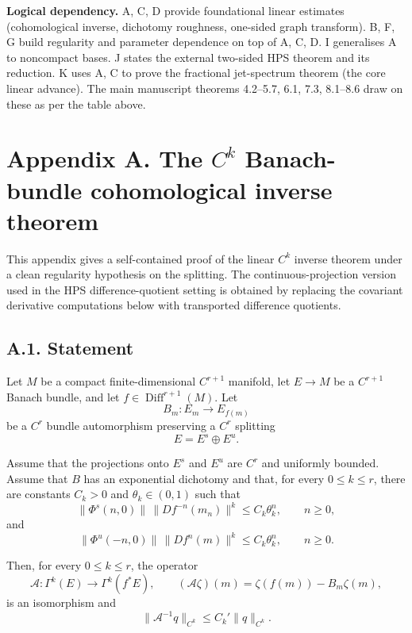 \documentclass[12pt,a4paper]{article}
\theoremstyle{plain}
\numberwithin{equation}{section}
\numberwithin{theorem}{section}
\begin{document}
\vspace{1em}

\noindent
\textbf{Logical dependency.} 
A, C, D provide foundational linear estimates (cohomological inverse, dichotomy roughness, one-sided graph transform).
B, F, G build regularity and parameter dependence on top of A, C, D.
I generalises A to noncompact bases.
J states the external two-sided HPS theorem and its reduction.
K uses A, C to prove the fractional jet-spectrum theorem (the core linear advance).
The main manuscript theorems 4.2--5.7, 6.1, 7.3, 8.1--8.6 draw on these as per the table above.


\section{Appendix A. The $C^k$ Banach-bundle cohomological inverse theorem}

This appendix gives a self-contained proof of the linear $C^k$ inverse theorem under a clean regularity hypothesis on the splitting. 
The continuous-projection version used in the HPS difference-quotient setting is obtained by replacing the covariant derivative computations below with transported difference quotients.

\subsection{A.1. Statement}

Let $M$ be a compact finite-dimensional $C^{r+1}$ manifold, let $E\to M$ be a $C^{r+1}$ Banach bundle, and let $f\in\operatorname{Diff}^{r+1}(M)$. Let
\[
B_m:E_m\to E_{f(m)}
\]
be a $C^r$ bundle automorphism preserving a $C^r$ splitting
\[
E=E^s\oplus E^u.
\]

Assume that the projections onto $E^s$ and $E^u$ are $C^r$ and uniformly bounded. Assume that $B$ has an exponential dichotomy and that, for every $0\le k\le r$, there are constants $C_k>0$ and $\theta_k\in(0,1)$ such that
\[
\|\Phi^s(n,0)\|\,\|Df^{-n}(m_n)\|^k
\le
C_k\theta_k^n,
\qquad n\ge0,
\]
and
\[
\|\Phi^u(-n,0)\|\,\|Df^n(m)\|^k
\le
C_k\theta_k^n,
\qquad n\ge0.
\]

Then, for every $0\le k\le r$, the operator
\[
\mathcal A:\Gamma^k(E)\to\Gamma^k(f^*E),
\qquad
(\mathcal A\zeta)(m)=\zeta(f(m))-B_m\zeta(m),
\]
is an isomorphism and
\[
\|\mathcal A^{-1}q\|_{C^k}
\le
C_k'\|q\|_{C^k}.
\]
\end{document}
